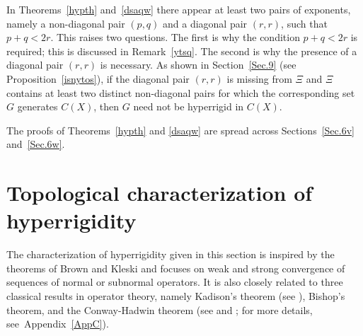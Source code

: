 \documentclass[reqno]{amsproc}
\numberwithin{equation}{section}
\theoremstyle{remark}
\theoremstyle{definition}
\begin{document}
In Theorems~\ref{hypth} and~\ref{dsaqw} there appear
at least two pairs of exponents, namely a non-diagonal
pair $(p,q)$ and a diagonal pair $(r,r)$, such that
$p+q<2r$. This raises two questions. The first is why
the condition $p+q<2r$ is required; this is discussed
in Remark~\ref{ytsq}. The second is why the presence
of a diagonal pair $(r,r)$ is necessary. As shown in
Section~\ref{Sec.9} (see Proposition~\ref{isnytos}),
if the diagonal pair $(r,r)$ is missing from $\varXi$
and $\varXi$ contains at least two distinct
non-diagonal pairs for which the corresponding set $G$
generates $C(X)$, then $G$ need not be hyperrigid in
$C(X)$.

The proofs of Theorems~\ref{hypth} and \ref{dsaqw} are
spread across Sections~\ref{Sec.6v} and~\ref{Sec.6w}.
   \section{Topological characterization of hyperrigidity}
The characterization of hyperrigidity given in this
section is inspired by the theorems of Brown and
Kleski \cite{Kle14,Brown16} and focuses on weak and
strong convergence of sequences of normal or subnormal
operators. It is also closely related to three
classical results in operator theory, namely Kadison's
theorem (see \cite[Theorem~4.2]{Ka68}), Bishop's
theorem, and the Conway-Hadwin theorem (see
\cite[Theorem~II.1.17]{Con91} and \cite{CoHad83}; for
more details, see~Appendix~\ref{AppC}).
\end{document}
